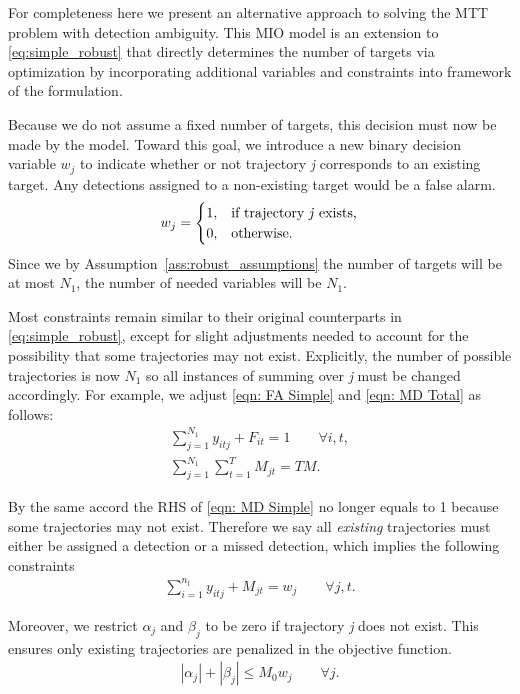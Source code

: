 For completeness here we present an alternative approach to solving the MTT problem with detection ambiguity. This MIO model is an extension to \eqref{eq:simple_robust} that directly determines the number of targets via optimization by incorporating additional variables and constraints into framework of the formulation. 

Because we do not assume a fixed number of targets, this decision must now be made by the model. Toward this goal, we introduce a new binary decision variable $w_{j}$ to indicate whether or not trajectory \textit{j} corresponds to an existing target. Any detections assigned to a non-existing target would be a false alarm. 
\[w_{j} = 
\begin{cases}
1, & \text{if trajectory \textit{j} exists,}\\
0, & \text{otherwise.}
\end{cases}\]
Since we by Assumption~\ref{ass:robust_assumptions} the number of targets will be at most $N_1$, the number of needed variables will be $N_1$.

Most constraints remain similar to their original counterparts in \eqref{eq:simple_robust}, except for slight adjustments needed to account for the possibility that some trajectories may not exist. Explicitly, the number of possible trajectories is now $N_{1}$ so all instances of summing over \textit{j} must be changed accordingly. For example, we adjust \eqref{eqn: FA Simple} and \eqref{eqn: MD Total} as follows: 
\begin{align*}
\sum_{j=1}^{N_{1}} y_{itj} + F_{it} = 1 \qquad \forall i,t,\\
\sum_{j=1}^{N_{1}} \sum_{t=1}^{T} M_{jt} = TM.
\end{align*}

By the same accord the RHS of \eqref{eqn: MD Simple} no longer equals to 1 because some trajectories may not exist. Therefore we say all \textit{existing} trajectories must either be assigned a detection or a missed detection, which implies the following constraints
\begin{align}\label{eqn: Existing Targets}
\sum_{i=1}^{n_{t}} y_{itj} + M_{jt} = w_{j} \qquad \forall j,t.
\end{align}

Moreover, we restrict $\alpha_{j}$ and $\beta_{j}$ to be zero if trajectory \textit{j} does not exist. This ensures only existing trajectories are penalized in the objective function. 
\begin{align*}
|\alpha_{j}|+|\beta_{j}| \leq M_{0}w_{j}\qquad \forall j.
\end{align*}

